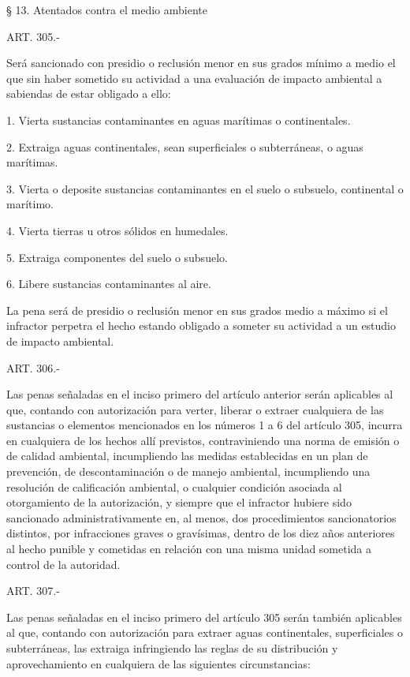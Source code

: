     § 13. Atentados contra el medio ambiente



    ART. 305.-

    Será sancionado con presidio o reclusión menor en sus grados mínimo a medio el que sin haber sometido su actividad a una evaluación de impacto ambiental a sabiendas de estar obligado a ello:

    1. Vierta sustancias contaminantes en aguas marítimas o continentales.

    2. Extraiga aguas continentales, sean superficiales o subterráneas, o aguas marítimas.

    3. Vierta o deposite sustancias contaminantes en el suelo o subsuelo, continental o marítimo.

    4. Vierta tierras u otros sólidos en humedales.

    5. Extraiga componentes del suelo o subsuelo.

    6. Libere sustancias contaminantes al aire.

    La pena será de presidio o reclusión menor en sus grados medio a máximo si el infractor perpetra el hecho estando obligado a someter su actividad a un estudio de impacto ambiental.


    ART. 306.-

    Las penas señaladas en el inciso primero del artículo anterior serán aplicables al que, contando con autorización para verter, liberar o extraer cualquiera de las sustancias o elementos mencionados en los números 1 a 6 del artículo 305, incurra en cualquiera de los hechos allí previstos, contraviniendo una norma de emisión o de calidad ambiental, incumpliendo las medidas establecidas en un plan de prevención, de descontaminación o de manejo ambiental, incumpliendo una resolución de calificación ambiental, o cualquier condición asociada al otorgamiento de la autorización, y siempre que el infractor hubiere sido sancionado administrativamente en, al menos, dos procedimientos sancionatorios distintos, por infracciones graves o gravísimas, dentro de los diez años anteriores al hecho punible y cometidas en relación con una misma unidad sometida a control de la autoridad.


    ART. 307.-

    Las penas señaladas en el inciso primero del artículo 305 serán también aplicables al que, contando con autorización para extraer aguas continentales, superficiales o subterráneas, las extraiga infringiendo las reglas de su distribución y aprovechamiento en cualquiera de las siguientes circunstancias:

